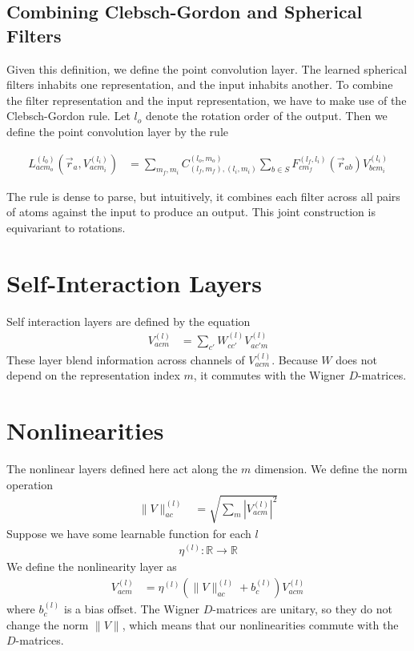 \documentclass[book.tex]{subfiles}
\begin{document}
\subsection{Combining Clebsch-Gordon and Spherical Filters}
Given this definition, we define the point convolution layer. The learned spherical filters inhabits one representation, and the input inhabits another. To combine the filter representation and the input representation, we have to make use of the Clebsch-Gordon rule. Let $l_o$ denote the rotation order of the output. Then we define the point convolution layer by the rule

\begin{align}
L^{(l_0)}_{acm_o}(\vec{r}_a, V^{(l_i)}_{acm_i}) &= \sum_{m_f, m_i} C^{(l_o, m_o)}_{(l_f, m_f), (l_i, m_i)} \sum_{b \in S} F^{(l_f, l_i)}_{cm_f}(\vec{r}_{ab})V^{(l_i)}_{bcm_i}
\end{align}

The rule is dense to parse, but intuitively, it combines each filter across all pairs of atoms against the input to produce an output. This joint construction is equivariant to rotations.
\section{Self-Interaction Layers}

Self interaction layers are defined by the equation
\begin{align}
V^{(l)}_{acm} &= \sum_{c'} 
 W^{(l)}_{cc'}V^{(l)}_{ac'm}
\end{align}
These layer blend information across channels of $V^{(l)}_{acm}$. Because $W$ does not depend on the representation index $m$, it commutes with the Wigner $D$-matrices.

\section{Nonlinearities}
The nonlinear layers defined here act along the $m$ dimension. We define the norm operation
\begin{align}
\|V\|^{(l)}_{ac} &= \sqrt{\sum_m |V^{(l)}_{acm}|^2}
\end{align}
Suppose we have some learnable function for each $l$
\begin{align}
\eta^{(l)}: \mathbb{R} \to \mathbb{R}
\end{align}
We define the nonlinearity layer as
\begin{align}
V^{(l)}_{acm} &= \eta^{(l)}(\|V\|^{(l)}_{ac} + b^{(l)}_c) V^{(l)}_{acm}
\end{align}
where $b^{(l)}_c$ is a bias offset. The Wigner $D$-matrices are unitary, so they do not change the norm $\|V\|$, which means that our nonlinearities commute with the $D$-matrices.
\end{document}
